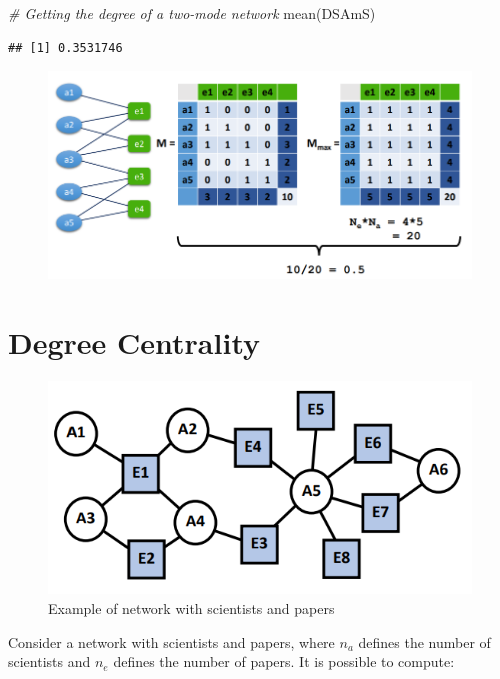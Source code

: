 \documentclass[
  notitlepage,
  onecolumn,
  openany]{book}
\newenvironment{Shaded}{\begin{snugshade}}{\end{snugshade}}
\newcommand{\CommentTok}[1]{\textcolor[rgb]{0.56,0.35,0.01}{\textit{#1}}}
\newcommand{\FunctionTok}[1]{\textcolor[rgb]{0.00,0.00,0.00}{#1}}
\newcommand{\NormalTok}[1]{#1}
\begin{document}
\begin{Shaded}
\begin{Highlighting}[]
\CommentTok{\# Getting the degree of a two{-}mode network}
\FunctionTok{mean}\NormalTok{(DSAmS)}
\end{Highlighting}
\end{Shaded}

\begin{verbatim}
## [1] 0.3531746
\end{verbatim}

\begin{figure}[h!]

{\centering \includegraphics[width=0.5\linewidth]{images/10-Two mode networks/Untitled 3} 

}

\end{figure}

\hypertarget{degree-centrality-2}{%
\section{Degree Centrality}\label{degree-centrality-2}}

\begin{figure}[h!]

{\centering \includegraphics[width=0.4\linewidth]{images/10-Two mode networks/Untitled 4} 

}

\caption{Example of network with scientists and papers}\label{fig:unnamed-chunk-65}
\end{figure}

Consider a network with scientists and papers, where \(n_a\) defines the number of scientists and \(n_e\) defines the number of papers. It is possible to compute:
\end{document}
